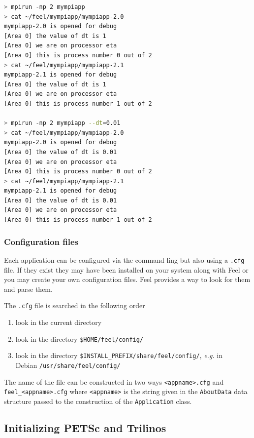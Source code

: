 \documentclass[a4paper]{book}
\newcommand{\feel}{Feel\xspace}
\begin{document}
\begin{lstlisting}[language=sh]
> mpirun -np 2 mympiapp
> cat ~/feel/mympiapp/mympiapp-2.0
mympiapp-2.0 is opened for debug
[Area 0] the value of dt is 1
[Area 0] we are on processor eta
[Area 0] this is process number 0 out of 2
> cat ~/feel/mympiapp/mympiapp-2.1
mympiapp-2.1 is opened for debug
[Area 0] the value of dt is 1
[Area 0] we are on processor eta
[Area 0] this is process number 1 out of 2

> mpirun -np 2 mympiapp --dt=0.01
> cat ~/feel/mympiapp/mympiapp-2.0
mympiapp-2.0 is opened for debug
[Area 0] the value of dt is 0.01
[Area 0] we are on processor eta
[Area 0] this is process number 0 out of 2
> cat ~/feel/mympiapp/mympiapp-2.1
mympiapp-2.1 is opened for debug
[Area 0] the value of dt is 0.01
[Area 0] we are on processor eta
[Area 0] this is process number 1 out of 2
\end{lstlisting}

\subsubsection{Configuration files}


Each application can be configured via the command ling but also using a
\verb|.cfg| file. If they exist they may have been installed on your system
along with \feel or you may create your own configuration files.  \feel provides
a way to look for them and parse them.

The \verb|.cfg| file is searched in the following order
\begin{enumerate}
\item look in the current directory
\item look in the directory \verb|$HOME/feel/config/|
\item look in the directory \verb|$INSTALL_PREFIX/share/feel/config/|,
  \emph{e.g.} in\\ Debian \verb|/usr/share/feel/config/|
\end{enumerate}
The name of the file can be constructed in two ways \verb|<appname>.cfg| and
\verb|feel_<appname>.cfg| where \verb|<appname>| is the string given in the
\verb|AboutData| data structure passed to the construction of the
\verb|Application| class.


\subsection{Initializing PETSc and Trilinos}
\end{document}

